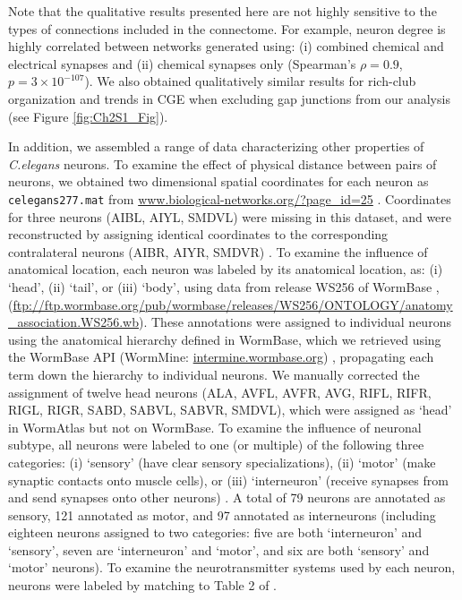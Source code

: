 Note that the qualitative results presented here are not highly sensitive to the types of connections included in the connectome.
For example, neuron degree is highly correlated between networks generated using: (i) combined chemical and electrical synapses and (ii) chemical synapses only (Spearman's $\rho= 0.9$, $p = 3 \times 10^{-107}$).
We also obtained qualitatively similar results for rich-club organization and trends in CGE when excluding gap junctions from our analysis (see Figure \ref{fig:Ch2S1_Fig}).

In addition, we assembled a range of data characterizing other properties of \emph{C.elegans} neurons.
To examine the effect of physical distance between pairs of neurons, we obtained two dimensional spatial coordinates for each neuron as \texttt{celegans277.mat} from \url{www.biological-networks.org/?page_id=25} \citep{Choe2004}.
Coordinates for three neurons (AIBL, AIYL, SMDVL) were missing in this dataset, and were reconstructed by assigning identical coordinates to the corresponding contralateral neurons (AIBR, AIYR, SMDVR) \citep{Varier2011}.
To examine the influence of anatomical location, each neuron was labeled by its anatomical location, as:
(i) `head', (ii) `tail', or (iii) `body', using data from release WS256 of WormBase \citep{Harris2010}, (\url{ftp://ftp.wormbase.org/pub/wormbase/releases/WS256/ONTOLOGY/anatomy_association.WS256.wb}).
These annotations were assigned to individual neurons using the anatomical hierarchy defined in WormBase, which we retrieved using the WormBase API (WormMine: \url{intermine.wormbase.org}) \citep{Harris2010}, propagating each term down the hierarchy to individual neurons.
We manually corrected the assignment of twelve head neurons (ALA, AVFL, AVFR, AVG, RIFL, RIFR, RIGL, RIGR, SABD, SABVL, SABVR, SMDVL), which were assigned as `head' in WormAtlas \citep{WormAtlas} but not on WormBase.
To examine the influence of neuronal subtype, all neurons were labeled to one (or multiple) of the following three categories:
(i) `sensory' (have clear sensory specializations),
(ii) `motor' (make synaptic contacts onto muscle cells), or
(iii) `interneuron' (receive synapses from and send synapses onto other neurons) \citep{White1986}.
A total of 79 neurons are annotated as sensory, 121 annotated as motor, and 97 annotated as interneurons (including eighteen neurons assigned to two categories: five are both `interneuron' and `sensory', seven are `interneuron' and `motor', and six are both `sensory' and `motor' neurons).
To examine the neurotransmitter systems used by each neuron, neurons were labeled by matching to Table 2 of \citet{Pereira2015}.
